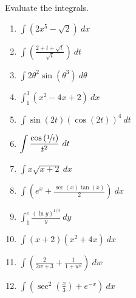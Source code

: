 \documentclass[12pt]{article}
\newcommand{\ds}{\displaystyle}
\begin{document}
Evaluate the integrals. %
\begin{enumerate}
\item $\ds \int \left(2x^5 - \sqrt2\right) \ dx $ \vfill
\item $\ds \int \left(\frac{2 + t + \sqrt{t}}{\sqrt{t}}\right) \ dt $ \vfill
\item $\ds \int 2\theta^2\sin\left(\theta^3\right) \ d\theta $\vfill
\newpage
\item $\ds \int_1^3 \left( x^2 - 4x + 2\right) \ dx $ \vfill
\item $\ds \int \sin(2t)(\cos(2t))^{4} \ dt $
\vfill
\item $\ds \int \frac{\cos\left(\nicefrac{1}{t}\right)}{t^2}\ dt $ \vfill

\newpage
\item $\ds \int x\sqrt{x + 2}\ dx $ \vfill
\item $\ds \int \left(e^x + \frac{\sec(x)\tan(x)}{2}\right)\ dx $ \vfill

\item $\ds \int_1^e \frac{(\ln y)^{1/3}}{y}\ dy$
\vfill
\newpage
\item $\ds \int (x + 2)(x^2 + 4x)\ dx $ \vfill
\item $\ds \int \left(\frac{2}{2w + 3} + \frac{1}{1 + w^2}\right)\ dw $ \vfill
\item $\ds \int \left( \sec^{2}\left(\frac{x}{3}\right) + e^{-x} \right)\ dx $ \vfill




\end{enumerate}
\end{document}
